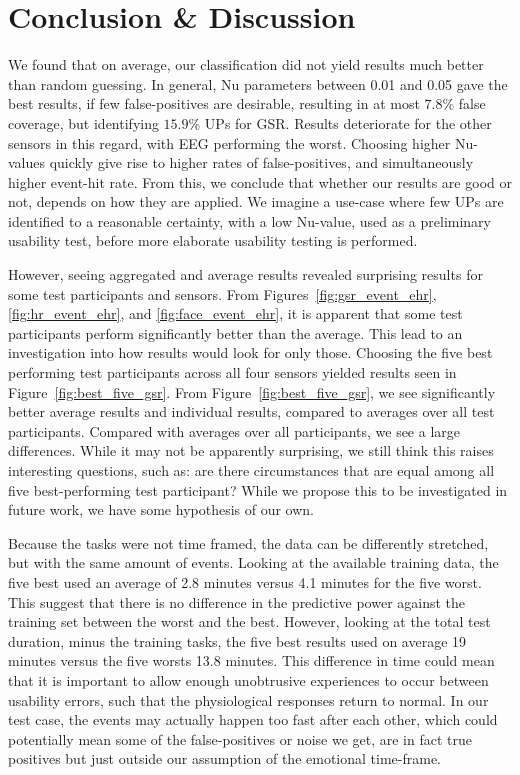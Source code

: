 \section{Conclusion \& Discussion}
We found that on average, our classification did not yield results much better than random guessing. In general, Nu
parameters between 0.01 and 0.05 gave the best results, if few false-positives are desirable, resulting in at most
$7.8\%$ false coverage, but identifying $15.9\%$ UPs for GSR. Results deteriorate for the other sensors in this regard,
with EEG performing the worst. Choosing higher Nu-values quickly give rise to higher rates of false-positives, and
simultaneously higher event-hit rate. From this, we conclude that whether our results are good or not, depends on how they
are applied. We imagine a use-case where few UPs are identified to a reasonable certainty, with a low Nu-value, used as
a preliminary usability test, before more elaborate usability testing is performed.

However, seeing aggregated and average results revealed surprising results for some test participants and sensors. From
Figures~\ref{fig:gsr_event_ehr},\ref{fig:hr_event_ehr}, and \ref{fig:face_event_ehr}, it is apparent that
some test participants perform significantly better than the average. This lead to an investigation into how results
would look for only those. Choosing the five best performing test participants across all four sensors yielded results
seen in Figure~\ref{fig:best_five_gsr}. From Figure~\ref{fig:best_five_gsr}, we see significantly better average results
and individual results, compared to averages over all test participants. Compared with averages over all participants,
we see a large differences. While it may not be apparently surprising, we still think this raises interesting questions,
such as: are there circumstances that are equal among all five best-performing test participant? While we propose this
to be investigated in future work, we have some hypothesis of our own.

Because the tasks were not time framed, the data can be differently stretched, but with the same amount of
events. Looking at the available training data, the five best used an average of 2.8 minutes versus 4.1 minutes for the
five worst. This suggest that there is no difference in the predictive power against the training set between the worst
and the best. However, looking at the total test duration, minus the training tasks, the five best results used on
average 19 minutes versus the five worsts 13.8 minutes. This difference in time could mean that it is important to allow
enough unobtrusive experiences to occur between usability errors, such that the physiological responses return to
normal. In our test case, the events may actually happen too fast after each other, which could potentially mean some of
the false-positives or noise we get, are in fact true positives but just outside our assumption of the emotional
time-frame.

